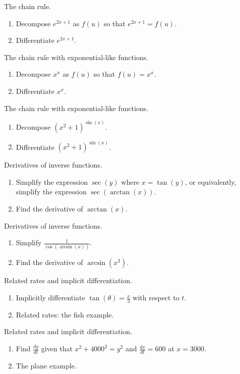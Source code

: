 \documentclass[../main.tex]{subfiles}
\begin{document}
The chain rule.
\begin{enumerate}
  \item Decompose \(e^{2x + 1}\) as \(f(u)\) so that \(e^{2x + 1} = f(u)\).

  \item Differentiate \(e^{2x+1}\).
\end{enumerate}

The chain rule with exponential-like functions.
\begin{enumerate}
  \item Decompose \(x^{x}\) as \(f(u)\) so that \(f(u) = x^{x}\).

  \item Differentiate \(x^{x}\).
\end{enumerate}

The chain rule with exponential-like functions.
\begin{enumerate}
  \item Decompose \((x^{2}+1)^{\sin(x)}\).
  \item Differentiate \((x^{2}+1)^{\sin(x)}\).
\end{enumerate}

Derivatives of inverse functions.
\begin{enumerate}
  \item Simplify the expression \(\sec(y)\) where \(x = \tan(y)\), or equivalently, simplify the expression \(\sec(\arctan(x))\).
  \item Find the derivative of \(\arctan(x)\).
\end{enumerate}

Derivatives of inverse functions.
\begin{enumerate}
  \item Simplify \(\frac{1}{\cos(\arcsin(x))}\).
  \item Find the derivative of \(\arcsin(x^{3})\).
\end{enumerate}

Related rates and implicit differentiation.
\begin{enumerate}
  \item Implicitly differentiate \(\tan(\theta) = \frac{x}{3}\) with respect to \(t\).
  \item Related rates: the fish example.
\end{enumerate}

Related rates and implicit differentiation.
\begin{enumerate}
  \item Find \(\frac{dy}{dt}\) given that \(x^{2} + 4000^{2} = y^{2}\) and \(\frac{dx}{dt} = 600\) at \(x = 3000\).

  \item The plane example.
\end{enumerate}
\end{document}
